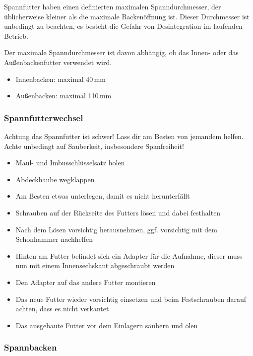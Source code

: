 \documentclass{\basedir/fablab-document}
\begin{document}
Spannfutter haben einen definierten maximalen Spanndurchmesser, der üblicherweise kleiner als die maximale Backenöffnung ist. Dieser Durchmesser ist unbedingt zu beachten, es besteht die Gefahr von Desintegration im laufenden Betrieb.

Der maximale Spanndurchmesser ist davon abhängig, ob das Innen- oder das Außenbackenfutter verwendet wird.

\begin{itemize}
	\item Innenbacken: maximal 40\,mm
	\item Außenbacken: maximal 110\,mm
\end{itemize}


\subsubsection{Spannfutterwechsel}

Achtung das Spannfutter ist schwer! Lass dir am Besten von jemandem helfen. Achte unbedingt auf Sauberkeit, insbesondere Spanfreiheit!
\begin{itemize}
\item Maul- und Imbusschlüsselsatz holen
\item Abdeckhaube wegklappen
\item Am Besten etwas unterlegen, damit es nicht herunterfällt
\item Schrauben auf der Rückseite des Futters lösen und dabei festhalten 
\item Nach dem Lösen vorsichtig herausnehmen, ggf. vorsichtig mit dem Schonhammer nachhelfen
\item Hinten am Futter befindet sich ein Adapter für die Aufnahme, dieser muss nun mit einem Innensechskant abgeschraubt werden
\item Den Adapter auf das andere Futter montieren
\item Das neue Futter wieder vorsichtig einsetzen und beim Festschrauben darauf achten, dass es nicht verkantet
\item Das ausgebaute Futter vor dem Einlagern säubern und ölen
\end{itemize}

\subsubsection{Spannbacken}
\end{document}
